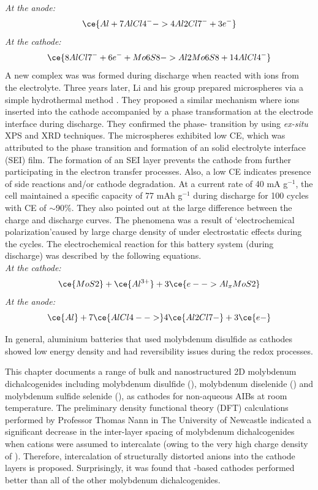 \textit{At the anode:} 
\begin{equation} \label{eqan}
\ce{Al + 7AlCl4^- -> 4Al2Cl7^- + 3e^-}
\end{equation}
\textit{At the cathode:}
\begin{equation}\label{eqcat}
\ce{8AlCl7^- + 6e^- + Mo6S8 -> Al2Mo6S8 + 14AlCl4^-}
\end{equation}
A new complex was  was formed during discharge when  reacted with  ions from the electrolyte. Three years later, Li and his group prepared  microspheres via a simple hydrothermal method \cite{li_rechargeable_2018}. They proposed a similar mechanism where  ions inserted into the  cathode accompanied by a phase transformation at the electrode interface during discharge. They confirmed the phase- transition by using \textit{ex-situ} XPS and XRD techniques. The  microspheres exhibited low CE, which was attributed to the  phase transition and formation of an solid electrolyte interface (SEI) film. The formation of an SEI layer prevents the cathode from further participating in the electron transfer processes. Also, a low CE indicates presence of side reactions and/or cathode degradation. At a current rate of 40 mA g$^{-1}$, the cell maintained a specific capacity of 77 mAh g$^{-1}$ during discharge for 100 cycles with CE of $\sim$90\%. They also pointed out at the large difference between the charge and discharge curves. The phenomena was a result of \lq electrochemical polarization\rq caused by large charge density of  under electrostatic effects during the cycles. The electrochemical reaction for this battery system (during discharge) was described by the following equations. \\
\textit{At the cathode:}
\begin{equation}
    \ce{MoS2} + \ce{Al^{3+}} + 3\ce{e- -> Al_xMoS2}
\end{equation}
\textit{At the anode:}
\begin{equation}
    \ce{Al} + 7\ce{AlCl4- ->} 4\ce{Al2Cl7-} + 3\ce{e-}
\end{equation}

In general, aluminium batteries that used molybdenum disulfide as cathodes showed low energy density and had reversibility issues during the redox processes. 

This chapter documents a range of bulk and nanostructured 2D molybdenum dichalcogenides including molybdenum disulfide (), molybdenum diselenide () and molybdenum sulfide selenide (), as cathodes for non-aqueous AIBs at room temperature. The preliminary density functional theory (DFT) calculations performed by Professor Thomas Nann in The University of Newcastle indicated a significant decrease in the inter-layer spacing of molybdenum dichalcogenides when  cations were assumed to intercalate (owing to the very high charge density of ). Therefore, intercalation of structurally distorted  anions into the  cathode layers is proposed. Surprisingly, it was found that -based cathodes performed better than all of the other molybdenum dichalcogenides.

